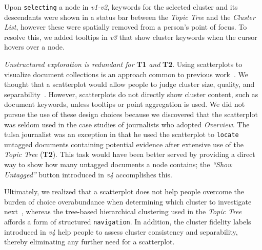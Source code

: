 Upon {\tt selecting} a node in {\it v1-v2}, keywords for the selected cluster and its descendants were shown in a status bar between the {\it Topic Tree} and the {\it Cluster List}, however these were spatially removed from a person's point of focus.
To resolve this, we added tooltips in {\it v3} that show cluster keywords when the cursor hovers over a node.

{\it Unstructured exploration is redundant for} {\bf T1} {\it and} {\bf T2}.
Using scatterplots to visualize document collections is an approach common to previous work~\cite{Chen2009,Granitzer2004,Endert2012b,Leaksplorer,Paulovich2007}.
We thought that a scatterplot would allow people to judge cluster size, quality, and separability~\cite{Sedlmair2013}.
However, scatterplots do not directly show cluster content, such as document keywords, unless tooltips or point aggregation is used.
We did not pursue the use of these design choices because we discovered that the scatterplot was seldom used in the case studies of journalists who adopted {\it Overview}.
The {\sc tulsa} journalist was an exception in that he used the scatterplot to {\tt locate} untagged documents containing potential evidence after extensive use of the {\it Topic Tree} ({\bf T2}).
This task would have been better served by providing a direct way to show how many untagged documents a node contains; the {\it ``Show Untagged''} button introduced in {\it v4} accomplishes this.

Ultimately, we realized that a scatterplot does not help people overcome the burden of choice overabundance when determining which cluster to investigate next~\cite{Schwartz2003}, whereas the tree-based hierarchical clustering used in the {\it Topic Tree} affords a form of structured {\tt navigation}.
In addition, the cluster fidelity labels introduced in {\it v4} help people to assess cluster consistency and separability, thereby eliminating any further need for a scatterplot.  

